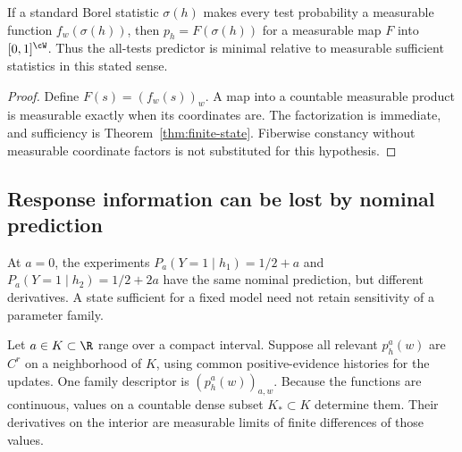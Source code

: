 \begin{proposition}\label{prop:minimal}
If a standard Borel statistic $\sigma(h)$ makes every test probability a measurable function $f_w(\sigma(h))$, then $p_h=F(\sigma(h))$ for a measurable map $F$ into $[0,1]^{\cW}$. Thus the all-tests predictor is minimal relative to measurable sufficient statistics in this stated sense.
\end{proposition}
\begin{proof}
Define $F(s)=(f_w(s))_w$. A map into a countable measurable product is measurable exactly when its coordinates are. The factorization is immediate, and sufficiency is Theorem~\ref{thm:finite-state}. Fiberwise constancy without measurable coordinate factors is not substituted for this hypothesis.
\end{proof}

\subsection{Response information can be lost by nominal prediction}
At $a=0$, the experiments $P_a(Y=1\mid h_1)=1/2+a$ and
$P_a(Y=1\mid h_2)=1/2+2a$ have the same nominal prediction, but different derivatives. A state sufficient for a fixed model need not retain sensitivity of a parameter family.

Let $a\in K\subset\R$ range over a compact interval. Suppose all relevant $p_h^a(w)$ are $C^r$ on a neighborhood of $K$, using common positive-evidence histories for the updates. One family descriptor is $(p_h^a(w))_{a,w}$. Because the functions are continuous, values on a countable dense subset $K_*\subset K$ determine them. Their derivatives on the interior are measurable limits of finite differences of those values.

